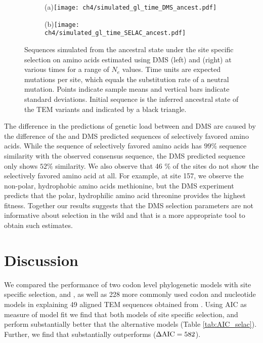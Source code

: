 \begin{figure}
    \centering
    \begin{subfigure}
        \centering
        (a)\texttt{[image: ch4/simulated\_gl\_time\_DMS\_ancest.pdf]}
    \end{subfigure}
    \begin{subfigure}
        \centering
        (b)\texttt{[image: ch4/simulated\_gl\_time\_SELAC\_ancest.pdf]}
    \end{subfigure}
    \caption{Sequences simulated from the ancestral state under the site specific selection on amino acids estimated using DMS (left) and \selac (right) at various times for a range of $N_e$ values.
    Time units are expected mutations per site, which equals the substitution rate of a neutral mutation.
    Points indicate sample means and vertical bars indicate standard deviations. Initial sequence is the inferred ancestral state of the TEM variants and indicated by a black triangle.}
    \label{fig:gl_sim}
\end{figure}

The difference in the predictions of genetic load between \selac and DMS are caused by the difference of the \selac and DMS predicted sequences of selectively favored amino acids.
While the \selac sequence of selectively favored amino acids has $99 \%$ sequence similarity with the observed consensus sequence, the DMS predicted sequence only shows $52 \%$ similarity.
We also observe that 46 \% of the sites do not show the selectively favored amino acid at all.
For example, at site 157, we observe the non-polar, hydrophobic amino acids methionine, but the DMS experiment predicts that the polar, hydrophilic amino acid threonine provides the highest fitness.
Together our results suggests that the DMS selection parameters are not informative about selection in the wild and that \selac is a more appropriate tool to obtain such estimates.


\section{Discussion}

We compared the performance of two codon level phylogenetic models with site specific selection, \phydms and \selac, as well as 228 more commonly used codon and nucleotide models in explaining 49 aligned TEM sequences obtained from \citet{bloom2017}.
Using AIC as measure of model fit we find that both models of site specific selection, \phydms and \selac perform substantially better that the alternative models (Table \ref{tab:AIC_selac}).
Further, we find that \selac substantially outperforms \phydms ($\Delta\text{AIC} = 582$).

